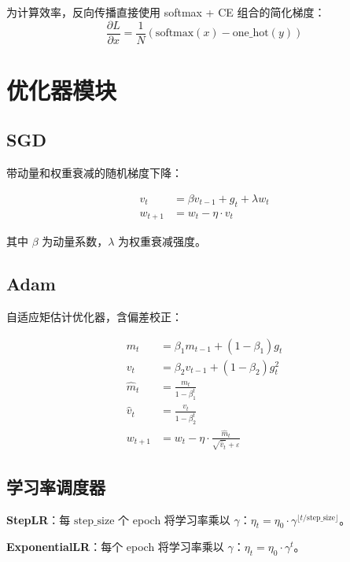 \documentclass[12pt,a4paper]{ctexart}
\begin{document}
为计算效率，反向传播直接使用 softmax + CE 组合的简化梯度：
\begin{equation}
\frac{\partial L}{\partial x} = \frac{1}{N}(\text{softmax}(x) - \text{one\_hot}(y))
\end{equation}

\section{优化器模块}

\subsection{SGD}

带动量和权重衰减的随机梯度下降：

\begin{align}
v_t &= \beta v_{t-1} + g_t + \lambda w_t \\
w_{t+1} &= w_t - \eta \cdot v_t
\end{align}

其中 $\beta$ 为动量系数，$\lambda$ 为权重衰减强度。

\subsection{Adam}

自适应矩估计优化器，含偏差校正：

\begin{align}
m_t &= \beta_1 m_{t-1} + (1-\beta_1) g_t \\
v_t &= \beta_2 v_{t-1} + (1-\beta_2) g_t^2 \\
\hat{m}_t &= \frac{m_t}{1-\beta_1^t} \\
\hat{v}_t &= \frac{v_t}{1-\beta_2^t} \\
w_{t+1} &= w_t - \eta \cdot \frac{\hat{m}_t}{\sqrt{\hat{v}_t} + \varepsilon}
\end{align}

\subsection{学习率调度器}

\textbf{StepLR}：每 $\text{step\_size}$ 个 epoch 将学习率乘以 $\gamma$：$\eta_t = \eta_0 \cdot \gamma^{\lfloor t / \text{step\_size} \rfloor}$。

\textbf{ExponentialLR}：每个 epoch 将学习率乘以 $\gamma$：$\eta_t = \eta_0 \cdot \gamma^t$。
\end{document}
